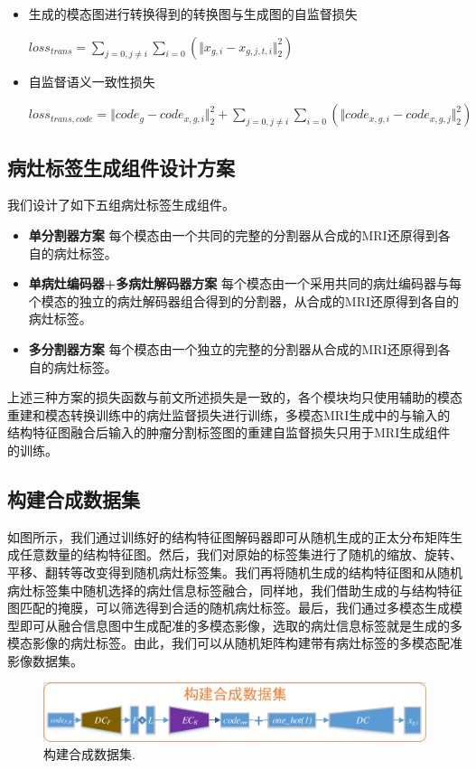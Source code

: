\documentclass[letterpaper]{article} %
\begin{document}
\begin{itemize}
	\item 生成的模态图进行转换得到的转换图与生成图的自监督损失

\begin{center}
	$loss_{trans}=\sum\limits_{j=0,j\neq i}\sum\limits_{i=0}(\Vert{x_{g,i}-x_{g,j,t,i}}\Vert_{2}^{2})$
\end{center}

	\item 自监督语义一致性损失
	
\begin{center}
	$loss_{trans,code}=\Vert{code_g-code_{x,g,i}}\Vert_{2}^{2}+\sum\limits_{j=0,j\neq i}\sum\limits_{i=0}(\Vert{code_{x,g,i}-code_{x,g,j}}\Vert_{2}^{2})$
\end{center}

\end{itemize}

\subsection{病灶标签生成组件设计方案}
我们设计了如下五组病灶标签生成组件。
\begin{itemize}
	\item \textbf{单分割器方案} 
	每个模态由一个共同的完整的分割器从合成的MRI还原得到各自的病灶标签。
	\item \textbf{单病灶编码器+多病灶解码器方案} 
	每个模态由一个采用共同的病灶编码器与每个模态的独立的病灶解码器组合得到的分割器，从合成的MRI还原得到各自的病灶标签。
	\item \textbf{多分割器方案} 
	每个模态由一个独立的完整的分割器从合成的MRI还原得到各自的病灶标签。
\end{itemize}
上述三种方案的损失函数与前文所述损失是一致的，各个模块均只使用辅助的模态重建和模态转换训练中的病灶监督损失进行训练，多模态MRI生成中的与输入的结构特征图融合后输入的肿瘤分割标签图的重建自监督损失只用于MRI生成组件的训练。

\subsection{构建合成数据集}
\label{make dataset}
如图所示，我们通过训练好的结构特征图解码器即可从随机生成的正太分布矩阵生成任意数量的结构特征图。然后，我们对原始的标签集进行了随机的缩放、旋转、平移、翻转等改变得到随机病灶标签集。我们再将随机生成的结构特征图和从随机病灶标签集中随机选择的病灶信息标签融合，同样地，我们借助生成的与结构特征图匹配的掩膜，可以筛选得到合适的随机病灶标签。最后，我们通过多模态生成模型即可从融合信息图中生成配准的多模态影像，选取的病灶信息标签就是生成的多模态影像的病灶标签。由此，我们可以从随机矩阵构建带有病灶标签的多模态配准影像数据集。
\begin{figure}
	\centering
	\includegraphics[width=0.98\linewidth]{figures/make_data}
	\caption{构建合成数据集.}
	\label{make_data}
\end{figure}
\end{document}
